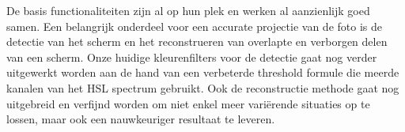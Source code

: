 De basis functionaliteiten zijn al op hun plek en werken al aanzienlijk goed samen. Een belangrijk onderdeel voor een accurate projectie van de foto is de detectie van het scherm en het reconstrueren van overlapte en verborgen delen van een scherm. Onze huidige kleurenfilters voor de detectie gaat nog verder uitgewerkt worden aan de hand van een verbeterde threshold formule die meerde kanalen van het HSL spectrum gebruikt. Ook de reconstructie methode gaat nog uitgebreid en verfijnd worden om niet enkel meer variërende situaties op te lossen, maar ook een nauwkeuriger resultaat te leveren.